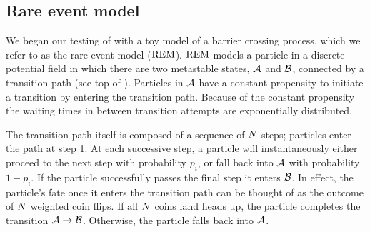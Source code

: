 \subsection{Rare event model}
\label{sec:rem}
We began our testing of  with a toy model of a barrier crossing process, which we refer to as the rare event model ($\text{REM}$). $\text{REM}$ models a particle in a discrete potential field in which there are two metastable states, $\mathcal{A}$ and $\mathcal{B}$, connected by a transition path (see top of ). Particles in $\mathcal{A}$ have a constant propensity to initiate a transition by entering the transition path. Because of the constant propensity the waiting times in between transition attempts are exponentially distributed.

The transition path itself is composed of a sequence of $N$ steps; particles enter the path at step 1. At each successive step, a particle will instantaneously either proceed to the next step with probability $p_i$, or fall back into $\mathcal{A}$ with probability $1 - p_i$. If the particle successfully passes the final step it enters $\mathcal{B}$. In effect, the particle's fate once it enters the transition path can be thought of as the outcome of $N$ weighted coin flips. If all $N$ coins land heads up, the particle completes the transition $\mathcal{A} \rightarrow \mathcal{B}$. Otherwise, the particle falls back into $\mathcal{A}$.

